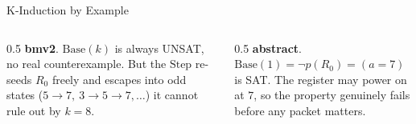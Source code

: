 \begin{frame}{K-Induction by Example}

  \vspace{0.5em}
  \begin{columns}[T,onlytextwidth]
    \begin{column}{0.5\textwidth}
      \footnotesize
      \textbf{\textcolor{palCerulean!60!black}{bmv2}}.\;
      \(\mathrm{Base}(k)\) is always \textcolor{palOlivine!60!black}{UNSAT}, no
      real counterexample. But the \(\mathrm{Step}\) re-seeds \(R_0\) freely and
      escapes into odd states (\(5{\to}7,\ 3{\to}5{\to}7,\dots\)) it cannot rule
      out by \(k = 8\).
    \end{column}
    \begin{column}{0.5\textwidth}
      \footnotesize
      \textbf{\textcolor{palCoral!65!black}{abstract}}.\;
      \(\mathrm{Base}(1) = \lnot p(R_0) = (a = 7)\) is
      \textcolor{palCoral!75!black}{SAT}. The register may power on at \(7\), so
      the property genuinely fails before any packet matters.
    \end{column}
  \end{columns}
\end{frame}


